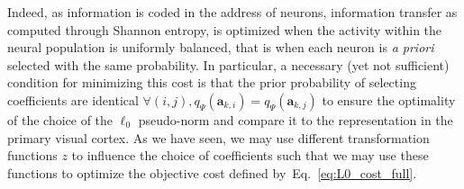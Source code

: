 \documentclass[draft]{article} %
\newcommand{\coef}{\mathbf{a}} %
\newcommand{\image}{\mathbf{y}} %
\newcommand{\dico}{\Phi} %
\newcommand{\seeEq}[1]{Eq.~\ref{eq:#1}}%
\begin{document}
Indeed, as information is coded in the address of neurons, information transfer as computed through Shannon entropy, is optimized when the activity within the neural population is uniformly balanced, that is when each neuron is \emph{a priori} selected with the same probability. In particular, a necessary (yet not sufficient) condition for minimizing this cost is that the prior probability of selecting coefficients are identical $\forall (i,j), q_\Psi(\coef_{k,i})=q_\Psi(\coef_{k,j})$ to ensure the optimality of the choice of the $\ell_0$ pseudo-norm and compare it to the representation in the primary visual cortex. As we have seen, we may use different transformation functions $z$ to influence the choice of coefficients such that we may use these functions to optimize the objective cost defined by~\seeEq{L0_cost_full}. 
\end{document}
